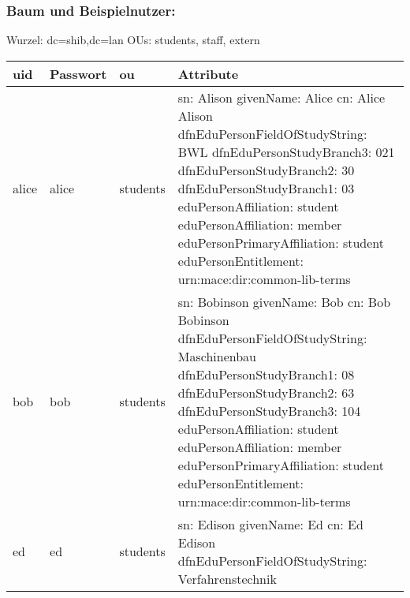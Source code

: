 \subsubsection*{Baum und Beispielnutzer:}
Wurzel: dc=shib,dc=lan\newline
OUs: students, staff, extern\newline
\begin{center}
\footnotesize
	\begin{tabular}{| l | l | l | p{10cm} | }
	\hline
	uid & Passwort & ou & Attribute \\ \hline\hline
	alice & alice & students &
sn: Alison\newline
givenName: Alice\newline
cn: Alice Alison\newline
dfnEduPersonFieldOfStudyString: BWL\newline
dfnEduPersonStudyBranch3: 021\newline
dfnEduPersonStudyBranch2: 30\newline
dfnEduPersonStudyBranch1: 03\newline
eduPersonAffiliation: student\newline
eduPersonAffiliation: member\newline
eduPersonPrimaryAffiliation: student\newline
eduPersonEntitlement: urn:mace:dir:common-lib-terms
	 \\ \hline
	 bob & bob & students &
sn: Bobinson\newline
givenName: Bob\newline
cn: Bob Bobinson\newline
dfnEduPersonFieldOfStudyString: Maschinenbau\newline
dfnEduPersonStudyBranch1: 08\newline
dfnEduPersonStudyBranch2: 63\newline
dfnEduPersonStudyBranch3: 104\newline
eduPersonAffiliation: student\newline
eduPersonAffiliation: member\newline
eduPersonPrimaryAffiliation: student\newline
eduPersonEntitlement: urn:mace:dir:common-lib-terms\\ \hline
	ed & ed & students &
sn: Edison\newline
givenName: Ed\newline
cn: Ed Edison\newline
dfnEduPersonFieldOfStudyString: Verfahrenstechnik\newline

\end{tabular}
\end{center}
